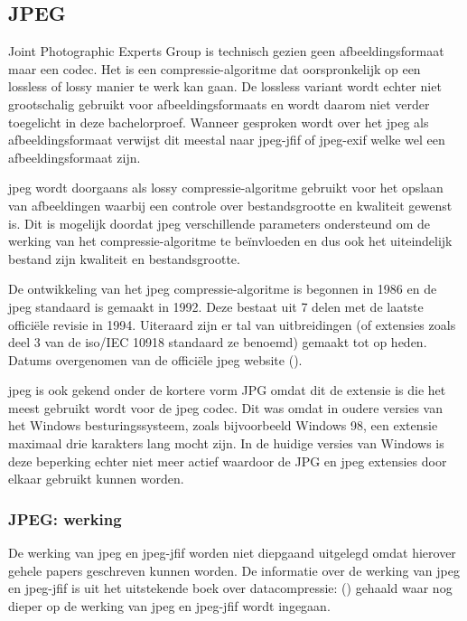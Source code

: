 \subsection{JPEG}
\label{sec:afbeeldingscompressie-jpeg}

Joint Photographic Experts Group is technisch gezien geen \gls{afbeeldingsformaat} maar een \gls{codec}. Het is een \gls{compressie-algoritme} dat oorspronkelijk op een \gls{lossless} of \gls{lossy} manier te werk kan gaan. De \gls{lossless} variant wordt echter niet grootschalig gebruikt voor \glspl{afbeeldingsformaat} en wordt daarom niet verder toegelicht in deze bachelorproef. Wanneer gesproken wordt over het \gls{jpeg} als \gls{afbeeldingsformaat} verwijst dit meestal naar  \gls{jpeg-jfif} of \gls{jpeg-exif} welke wel een \gls{afbeeldingsformaat} zijn.

\gls{jpeg} wordt doorgaans als \gls{lossy} \gls{compressie-algoritme} gebruikt voor het opslaan van afbeeldingen waarbij een controle over bestandsgrootte en kwaliteit gewenst is. Dit is mogelijk doordat \gls{jpeg} verschillende parameters ondersteund om de werking van het \gls{compressie-algoritme} te beïnvloeden en dus ook het uiteindelijk bestand zijn kwaliteit en bestandsgrootte.

De ontwikkeling van het \gls{jpeg} \gls{compressie-algoritme} is begonnen in 1986 en de \gls{jpeg} standaard is gemaakt in 1992. Deze bestaat uit 7 delen met de laatste officiële revisie in 1994. Uiteraard zijn er tal van uitbreidingen (of extensies zoals deel 3 van de \gls{iso}/IEC 10918 standaard ze benoemd) gemaakt tot op heden. Datums overgenomen van de officiële \gls{jpeg} website (\cite{jpegorg}). 

\gls{jpeg} is ook gekend onder de kortere vorm JPG omdat dit de extensie is die het meest gebruikt wordt voor de \gls{jpeg} \gls{codec}. Dit was omdat in oudere versies van het Windows besturingssysteem, zoals bijvoorbeeld Windows 98, een \gls{extensie} maximaal drie karakters lang mocht zijn. In de huidige versies van Windows is deze beperking echter niet meer actief waardoor de JPG en \gls{jpeg} \glspl{extensie} door elkaar gebruikt kunnen worden.

\subsubsection{JPEG: werking}
\label{sec:afbeeldingscompressie-jpeg-werking}

De werking van \gls{jpeg} en \gls{jpeg-jfif} worden niet diepgaand uitgelegd omdat hierover gehele papers geschreven kunnen worden. De informatie over de werking van  \gls{jpeg} en \gls{jpeg-jfif} is uit het uitstekende boek over \gls{datacompressie}:  (\cite{Salomon2006}) gehaald waar nog dieper op de werking van \gls{jpeg} en \gls{jpeg-jfif} wordt ingegaan.

